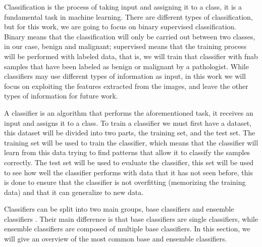 
Classification is the process of taking input and assigning it to a class, it is a fundamental task in machine learning. There are different types of classification, but for this work, we are going to focus on binary supervised classification. Binary means that the classification will only be carried out between two classes, in our case, benign and malignant; supervised means that the training process will be performed with labeled data, that is, we will train that classifier with \ac{fnab} samples that have been labeled as benign or malignant by a pathologist. While classifiers may use different types of information as input, in this work we will focus on exploiting the features extracted from the images, and leave the other types of information for future work.



A classifier is an algorithm that performs the aforementioned task, it receives an input and assigns it to a class. To train a classifier we must first have a dataset, this dataset will be divided into two parts, the training set, and the test set. The training set will be used to train the classifier, which means that the classifier will learn from this data trying to find patterns that allow it to classify the samples correctly. The test set will be used to evaluate the classifier, this set will be used to see how well the classifier performs with data that it has not seen before, this is done to ensure that the classifier is not overfitting (memorizing the training data) and that it can generalize to new data.

Classifiers can be split into two main groups, base classifiers and ensemble classifiers \cite{yadav_comparative_2020}.
Their main difference is that base classifiers are single classifiers, while ensemble classifiers are composed of multiple base classifiers. In this section, we will give an overview of the most common base and ensemble classifiers.

